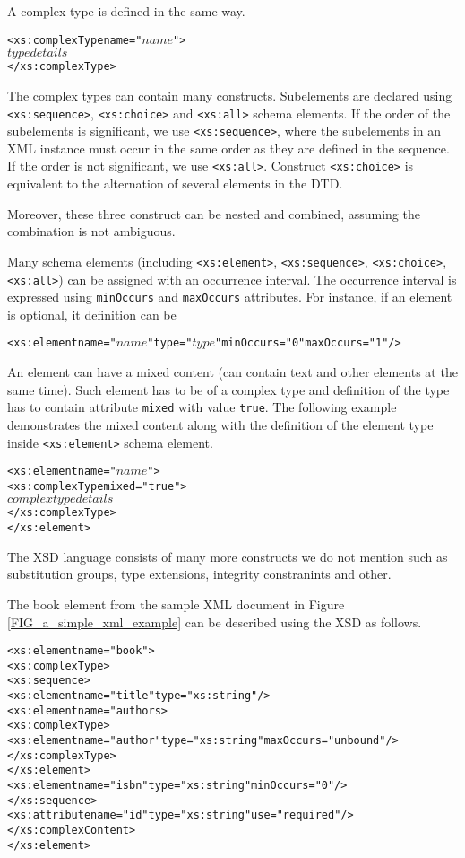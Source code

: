 A complex type is defined in the same way.
\begin{alltt}
<xs:complexType name="\(name\)">
  \(type details\)
</xs:complexType>
\end{alltt}
The complex types can contain many constructs. Subelements are declared using \texttt{<xs:sequence>}, \texttt{<xs:choice>} and \texttt{<xs:all>} schema elements. If the order of the subelements is significant, we use \texttt{<xs:sequence>}, where the subelements in an XML instance must occur in the same order as they are defined in the sequence. If the order is not significant, we use \texttt{<xs:all>}. Construct \texttt{<xs:choice>} is equivalent to the alternation of several elements in the DTD.

Moreover, these three construct can be nested and combined, assuming the combination is not ambiguous.

Many schema elements (including \texttt{<xs:element>}, \texttt{<xs:sequence>}, \texttt{<xs:choice>}, \texttt{<xs:all>}) can be assigned with an occurrence interval. The occurrence interval is expressed using \texttt{minOccurs} and \texttt{maxOccurs} attributes. For instance, if an element is optional, it definition can be
\begin{alltt}
<xs:element name="\(name\)" type="\(type\)" minOccurs="0" maxOccurs="1"/>
\end{alltt}

An element can have a mixed content (can contain text and other elements at the same time). Such element has to be of a complex type and definition of the type has to contain attribute \texttt{mixed} with value \texttt{true}. The following example demonstrates the mixed content along with the definition of the element type inside \texttt{<xs:element>} schema element.
\begin{alltt}
<xs:element name="\(name\)">
  <xs:complexType mixed="true">
    \(complex type details\)
  </xs:complexType>
</xs:element>
\end{alltt}

The XSD language consists of many more constructs we do not mention such as substitution groups, type extensions, integrity constranints and other.

The book element from the sample XML document in Figure \ref{FIG_a_simple_xml_example} can be described using the XSD as follows.
\begin{alltt}
<xs:element name="book">
  <xs:complexType>
    <xs:sequence>
      <xs:element name="title" type="xs:string"/>
      <xs:element name="authors>
        <xs:complexType>
          <xs:element name="author" type="xs:string" maxOccurs="unbound"/>
        </xs:complexType>
      </xs:element>
      <xs:element name="isbn" type="xs:string" minOccurs="0"/>
    </xs:sequence>
    <xs:attribute name="id" type="xs:string" use="required"/>
  </xs:complexContent>
</xs:element>
\end{alltt}

